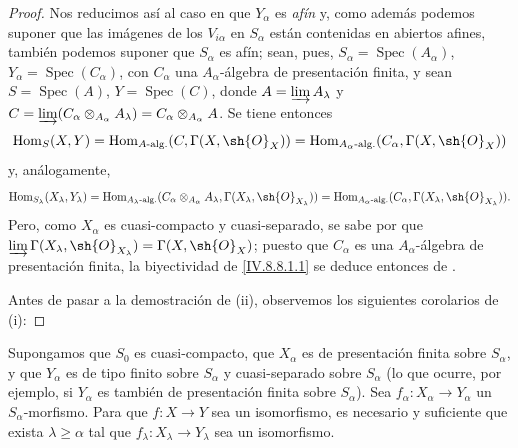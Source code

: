\begin{proof}
Nos reducimos así al caso en que $Y_\alpha$ es \emph{afín} y, como además podemos suponer que las imágenes de los $V_{i\alpha}$ en $S_\alpha$ están contenidas en abiertos afines, también podemos suponer que $S_\alpha$ es afín; sean, pues, $S_\alpha=\operatorname{Spec}(A_\alpha)$, $Y_\alpha=\operatorname{Spec}(C_\alpha)$, con $C_\alpha$ una $A_\alpha$-álgebra de presentación finita, y sean $S=\operatorname{Spec}(A)$, $Y=\operatorname{Spec}(C)$, donde $A=\varinjlim A_\lambda$ y $C=\varinjlim(C_\alpha\otimes_{A_\alpha}A_\lambda)=C_\alpha\otimes_{A_\alpha}A$.
Se tiene entonces
\[
  \operatorname{Hom}_S(X,Y)=\operatorname{Hom}_{A\text{-alg.}}(C,\Gamma(X,\sh{O}_X))=\operatorname{Hom}_{A_\alpha\text{-alg.}}(C_\alpha,\Gamma(X,\sh{O}_X))
\]
 y, análogamente,
\[
  \operatorname{Hom}_{S_\lambda}(X_\lambda,Y_\lambda)=\operatorname{Hom}_{A_\lambda\text{-alg.}}(C_\alpha\otimes_{A_\alpha}A_\lambda,\Gamma(X_\lambda,\sh{O}_{X_\lambda}))=\operatorname{Hom}_{A_\alpha\text{-alg.}}(C_\alpha,\Gamma(X_\lambda,\sh{O}_{X_\lambda})).
\]
Pero, como $X_\alpha$ es cuasi-compacto y cuasi-separado, se sabe por  que $\varinjlim\Gamma(X_\lambda,\sh{O}_{X_\lambda})=\Gamma(X,\sh{O}_X)$; puesto que $C_\alpha$ es una $A_\alpha$-álgebra de presentación finita, la biyectividad de \eqref{IV.8.8.1.1} se deduce entonces de .

Antes de pasar a la demostración de (ii), observemos los siguientes corolarios de (i):
\end{proof}

\begin{corollary}[8.8.2.4]
\label{IV.8.8.2.4}
Supongamos que $S_0$ es cuasi-compacto, que $X_\alpha$ es de presentación finita sobre $S_\alpha$, y que $Y_\alpha$ es de tipo finito sobre $S_\alpha$ y cuasi-separado sobre $S_\alpha$ (lo que ocurre, por ejemplo, si $Y_\alpha$ es también
de presentación finita sobre $S_\alpha$).
Sea $f_\alpha:X_\alpha\to Y_\alpha$ un $S_\alpha$-morfismo.
Para que $f:X\to Y$ sea un isomorfismo, es necesario y suficiente que exista $\lambda\geqslant\alpha$ tal que $f_\lambda:X_\lambda\to Y_\lambda$ sea un isomorfismo.
\end{corollary}

